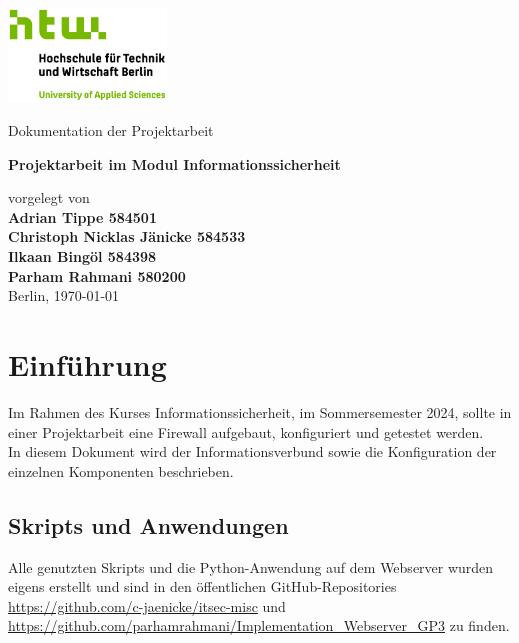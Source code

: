 \documentclass[
    a4paper,
    pagesize,
	pdftex,
    12pt,
]{scrartcl}
\begin{document}
\begin{titlepage}
    \begin{center}
        \includegraphics[height=25mm]{S04_HTW_Berlin_Logo_pos_FARBIG_RGB.jpg} \\
        \vspace{1.0cm}

        Dokumentation der Projektarbeit
    
        \vspace{1.5cm}   

        \textbf{Projektarbeit im Modul Informationssicherheit}

        \vspace{1.5cm}

        vorgelegt von \\
        \textbf{Adrian Tippe 584501} \\
        \textbf{Christoph Nicklas Jänicke 584533} \\
        \textbf{Ilkaan Bingöl 584398} \\
        \textbf{Parham Rahmani 580200} \\

        \vspace{1.5cm}    
        Berlin, \today\\
    \end{center}
\end{titlepage}


\thispagestyle{empty}
\tableofcontents
\newpage


\section{Einführung}
Im Rahmen  des  Kurses Informationssicherheit,  im Sommersemester 2024, sollte in einer Projektarbeit eine Firewall aufgebaut,  konfiguriert  und getestet werden. \\
In  diesem Dokument wird der Informationsverbund sowie die Konfiguration  der  einzelnen Komponenten  beschrieben.

\subsection{Skripts und Anwendungen}
Alle genutzten Skripts und die Python-Anwendung auf dem Webserver wurden eigens erstellt und sind in den öffentlichen GitHub-Repositories \\
\url{https://github.com/c-jaenicke/itsec-misc} und 
\url{https://github.com/parhamrahmani/Implementation_Webserver_GP3}
zu finden.
\end{document}
